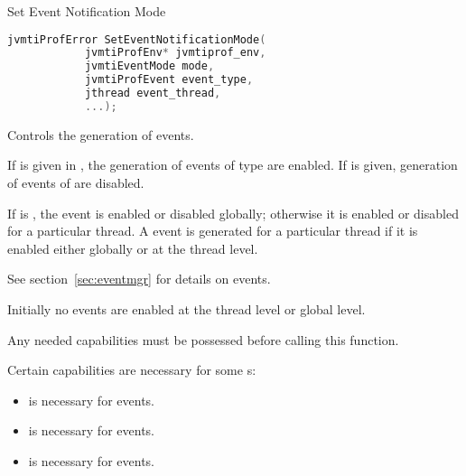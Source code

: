 \begin{apidef}{Set Event Notification Mode}
\begin{lstlisting}[language=C]
jvmtiProfError SetEventNotificationMode(
            jvmtiProfEnv* jvmtiprof_env,
            jvmtiEventMode mode,
            jvmtiProfEvent event_type,
            jthread event_thread,
            ...);
\end{lstlisting}

\begin{apidesc}
Controls the generation of events.

If  is given in , the generation of events of type  are enabled. If  is given, generation of events of  are disabled.

If  is , the event is enabled or disabled globally; otherwise it is enabled or disabled for a particular thread. A event is generated for a particular thread if it is enabled either globally or at the thread level.

See section~\ref{sec:eventmgr} for details on events.


Initially no events are enabled at the thread level or global level.

Any needed capabilities must be possessed before calling this function.
\end{apidesc}

\begin{apiphase}
\apiphaseonloadlive
\end{apiphase}

\begin{apicap}
\apicaprequired

Certain capabilities are necessary for some s:
\begin{itemize}
\item {} is necessary for  events.
\item {} is necessary for  events.
\item {} is necessary for  events.
\end{itemize}
\end{apicap}


\end{apidef}
